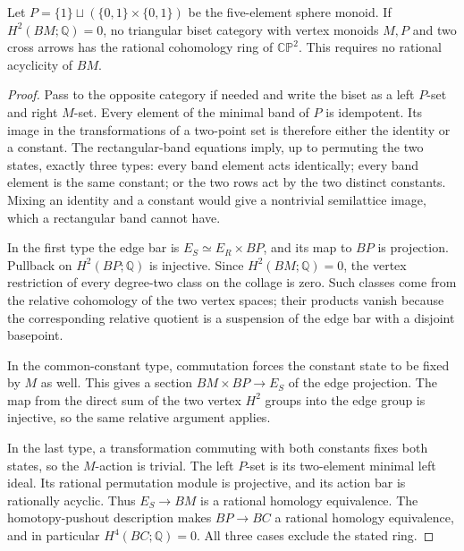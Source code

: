 \begin{lemma}
\label{C:two-arrow-sphere-opposite}
Let $P=\{1\}\sqcup(\{0,1\}\times\{0,1\})$ be the
five-element sphere monoid.  If $H^2(BM;\mathbb Q)=0$, no
triangular biset category with vertex monoids $M,P$ and two
cross arrows has the rational cohomology ring of
$\mathbb{CP}^2$.  This requires no rational acyclicity of $BM$.
\end{lemma}
\begin{proof}
Pass to the opposite category if needed and write the biset as
a left $P$-set and right $M$-set.  Every element of the minimal
band of $P$ is idempotent.  Its image in the transformations of
a two-point set is therefore either the identity or a constant.
The rectangular-band equations imply, up to permuting the two
states, exactly three types: every band element acts identically;
every band element is the same constant; or the two rows act by
the two distinct constants.  Mixing an identity and a constant
would give a nontrivial semilattice image, which a rectangular
band cannot have.

In the first type the edge bar is $E_S\simeq E_R\times BP$,
and its map to $BP$ is projection.  Pullback on $H^2(BP;\mathbb Q)$
is injective.  Since $H^2(BM;\mathbb Q)=0$, the vertex restriction
of every degree-two class on the collage is zero.  Such classes
come from the relative cohomology of the two vertex spaces;
their products vanish because the corresponding relative quotient
is a suspension of the edge bar with a disjoint basepoint.

In the common-constant type, commutation forces the constant state
to be fixed by $M$ as well.  This gives a section
$BM\times BP\to E_S$ of the edge projection.  The map from
the direct sum of the two vertex $H^2$ groups into the edge group
is injective, so the same relative argument applies.

In the last type, a transformation commuting with both constants
fixes both states, so the $M$-action is trivial.  The left $P$-set
is its two-element minimal left ideal.  Its rational permutation
module is projective, and its action bar is rationally acyclic.
Thus $E_S\to BM$ is a rational homology equivalence.  The
homotopy-pushout description makes $BP\to BC$ a rational homology
equivalence, and in particular $H^4(BC;\mathbb Q)=0$.
All three cases exclude the stated ring.
\end{proof}


